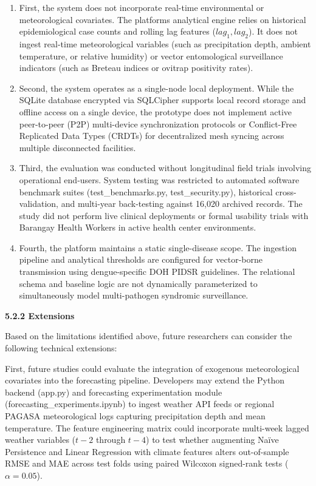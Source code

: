 \documentclass[
]{article}
\begin{document}
\begin{enumerate}
\def\labelenumi{\arabic{enumi}.}
\item
  First, the system does not incorporate real-time environmental or
  meteorological covariates. The platform\textquotesingle s analytical
  engine relies on historical epidemiological case counts and rolling
  lag features (\(lag_{1},lag_{2}\)). It does not ingest real-time
  meteorological variables (such as precipitation depth, ambient
  temperature, or relative humidity) or vector entomological
  surveillance indicators (such as Breteau indices or ovitrap positivity
  rates).
\item
  Second, the system operates as a single-node local deployment. While
  the SQLite database encrypted via SQLCipher supports local record
  storage and offline access on a single device, the prototype does not
  implement active peer-to-peer (P2P) multi-device synchronization
  protocols or Conflict-Free Replicated Data Types (CRDTs) for
  decentralized mesh syncing across multiple disconnected facilities.
\item
  Third, the evaluation was conducted without longitudinal field trials
  involving operational end-users. System testing was restricted to
  automated software benchmark suites (test\_benchmarks.py,
  test\_security.py), historical cross-validation, and multi-year
  back-testing against 16,020 archived records. The study did not
  perform live clinical deployments or formal usability trials with
  Barangay Health Workers in active health center environments.
\item
  Fourth, the platform maintains a static single-disease scope. The
  ingestion pipeline and analytical thresholds are configured for
  vector-borne transmission using dengue-specific DOH PIDSR guidelines.
  The relational schema and baseline logic are not dynamically
  parameterized to simultaneously model multi-pathogen syndromic
  surveillance.
\end{enumerate}

\textbf{5.2.2 Extensions}

Based on the limitations identified above, future researchers can
consider the following technical extensions:

First, future studies could evaluate the integration of exogenous
meteorological covariates into the forecasting pipeline. Developers may
extend the Python backend (app.py) and forecasting experimentation
module (forecasting\_experiments.ipynb) to ingest weather API feeds or
regional PAGASA meteorological logs capturing precipitation depth and
mean temperature. The feature engineering matrix could incorporate
multi-week lagged weather variables (\(t - 2\) through \(t - 4\)) to
test whether augmenting Naïve Persistence and Linear Regression with
climate features alters out-of-sample RMSE and MAE across test folds
using paired Wilcoxon signed-rank tests (\(\alpha = 0.05\)).
\end{document}
